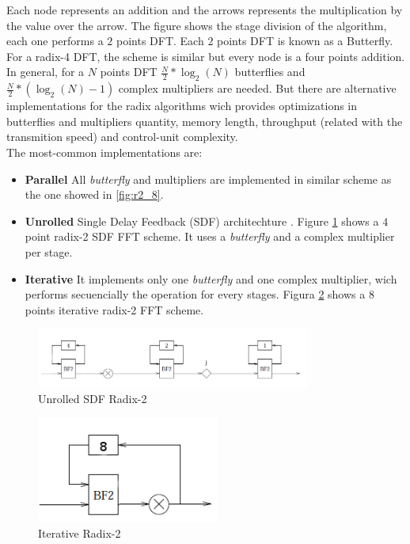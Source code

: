 \documentclass[conference]{IEEEtran}
\begin{document}
Each node represents an addition and the arrows represents the multiplication by the value over the arrow. 
The figure shows the stage division of the algorithm, each one performs a $2$ points DFT. Each $2$ points DFT 
is known as a Butterfly. For a radix-4 DFT, the scheme is similar but every node is a four points addition.\\
In general, for a $N$ points DFT $\frac{N}{2}*\log_2(N)$ butterflies and $\frac{N}{2}*(\log_2(N)-1)$ complex multipliers
are needed. But there are alternative implementations for the radix algorithms wich provides optimizations in 
butterflies and multipliers quantity, memory length, throughput (related with the transmition speed) and control-unit
complexity.\\
The most-common implementations are:

\begin{itemize}
  \item \textbf{Parallel} All \textit{butterfly} and multipliers are implemented in similar scheme as 
  the one showed in \ref{fig:r2_8}.
  \item \textbf{Unrolled} Single Delay Feedback (SDF) architechture \cite{torkelson}. 
  Figure \ref{fig:r2sdf} shows a $4$ point radix-2 SDF FFT scheme.
  It uses a \textit{butterfly} and a complex multiplier per stage.
  \item \textbf{Iterative} It implements only one \textit{butterfly} and one complex multiplier, wich performs secuencially
  the operation for every stages. Figura \ref{fig:r2sBf} shows a $8$ points iterative radix-2 FFT scheme. 
\end{itemize}

\begin{figure}[htb!]
        \centering
        \includegraphics[width=9cm]{./figures/r2sdf.png}
        \caption{Unrolled SDF Radix-2}
        \label{fig:r2sdf}
\end{figure}

\begin{figure}[htb!]
        \centering
        \includegraphics[width=6cm]{./figures/r2sBf.png}
        \caption{Iterative Radix-2}
        \label{fig:r2sBf}
\end{figure}
\end{document}
